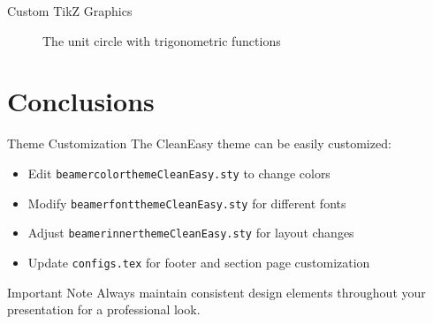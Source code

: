 \begin{frame}{Custom TikZ Graphics}

  \begin{figure}
      \centering
      \caption{The unit circle with trigonometric functions}
      \label{fig:exampleTikz}
  \end{figure}
\end{frame}

\section{Conclusions}
\begin{frame}{Theme Customization}
  The CleanEasy theme can be easily customized:
  
  \begin{itemize}
    \item Edit \texttt{beamercolorthemeCleanEasy.sty} to change colors
    \item Modify \texttt{beamerfontthemeCleanEasy.sty} for different fonts
    \item Adjust \texttt{beamerinnerthemeCleanEasy.sty} for layout changes
    \item Update \texttt{configs.tex} for footer and section page customization
  \end{itemize}
  
  \begin{alertblock}{Important Note}
    Always maintain consistent design elements throughout your presentation for a professional look.
  \end{alertblock}
\end{frame}

